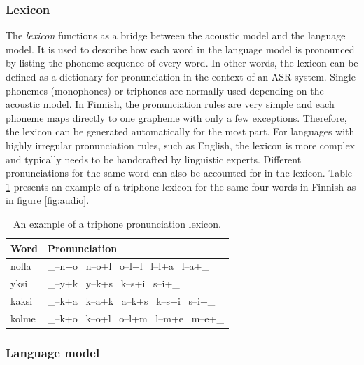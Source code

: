 \documentclass[english, 12pt, a4paper, pdftex, elec, utf8]{aaltothesis}
\begin{document}
\subsubsection{Lexicon}

The \textit{lexicon} functions as a bridge between the acoustic model and the language model. It is used to describe how each word in the language model is pronounced by listing the phoneme sequence of every word. In other words, the lexicon can be defined as a dictionary for pronunciation in the context of an ASR system. Single phonemes (monophones) or triphones are normally used depending on the acoustic model. In Finnish, the pronunciation rules are very simple and each phoneme maps directly to one grapheme with only a few exceptions. Therefore, the lexicon can be generated automatically for the most part. For languages with highly irregular pronunciation rules, such as English, the lexicon is more complex and typically needs to be handcrafted by linguistic experts. Different pronunciations for the same word can also be accounted for in the lexicon. Table \ref{table:triphone} presents an example of a triphone lexicon for the same four words in Finnish as in figure \ref{fig:audio}. \\
\begin{table}[h]
	\renewcommand{\arraystretch}{1.2}  %
	\setlength{\tabcolsep}{20pt}       %
	\centering
	\caption{An example of a triphone pronunciation lexicon.}
	\label{table:triphone}
	\begin{tabular}{@{}ll@{}}
		\toprule
		\textbf{Word}  & \textbf{Pronunciation}              \\ \midrule
		nolla & \_--n+o \ n--o+l \ o--l+l \ l--l+a \ l--a+\_ \\
		yksi  & \_--y+k \ y--k+s \ k--s+i \ s--i+\_       	 \\
		kaksi & \_--k+a \ k--a+k \ a--k+s \ k--s+i \ s--i+\_ \\
		kolme & \_--k+o \ k--o+l \ o--l+m \ l--m+e \ m--e+\_ \\ \bottomrule
	\end{tabular}
\end{table}

\subsubsection{Language model}
\end{document}
